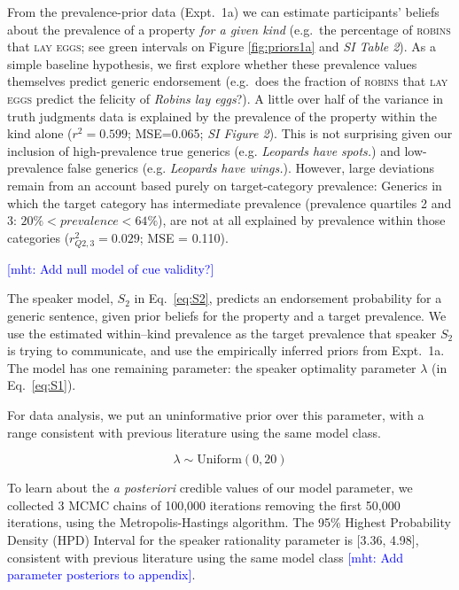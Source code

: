 \documentclass[12pt,letterpaper]{article}
\newcommand{\mht}[1]{\textcolor{Blue}{[mht: #1]}}
\begin{document}
From the prevalence-prior data (Expt.~1a) we can estimate participants' beliefs about the prevalence of a property \emph{for a given kind} (e.g.~the percentage of \textsc{robins} that \textsc{lay eggs}; see green intervals on Figure \ref{fig:priors1a} and \emph{SI Table 2}).
As a simple baseline hypothesis, we first explore whether these prevalence values themselves predict generic endorsement (e.g.~does the fraction of \textsc{robins} that \textsc{lay eggs} predict the felicity of \emph{Robins lay eggs}?).
A little over half of the variance in truth judgments data is explained by the prevalence of the property within the kind alone ($r^2 = 0.599$; MSE=0.065; \emph{SI Figure 2}). 
This is not surprising given our inclusion of high-prevalence true generics (e.g. \emph{Leopards have spots.}) and low-prevalence false generics (e.g. \emph{Leopards have wings.}). 
However, large deviations remain from an account based purely on target-category prevalence: Generics in which the target category has intermediate prevalence (prevalence quartiles 2 and 3: $ 20\% < prevalence < 64\%$), are not at all explained by prevalence within those categories ($r_{Q2,3}^2 = 0.029$; MSE = 0.110).


\mht{Add null model of cue validity?}

The speaker model, $S_2$ in Eq.~\ref{eq:S2}, predicts an endorsement probability for a generic sentence, given prior beliefs for the property and a target prevalence. 
We use the estimated within--kind prevalence as the target prevalence that speaker $S_2$ is trying to communicate, and use the
empirically inferred priors from Expt.~1a. The model has one remaining parameter: the speaker optimality parameter $\lambda$ (in Eq.~\ref{eq:S1}).

For data analysis, we put an uninformative prior over this parameter, with a range consistent with previous literature using the same model class.

$$
\lambda \sim \text{Uniform}(0,20)
$$

To learn about the \emph{a posteriori} credible values of our model parameter, we collected 3 MCMC chains of 100,000 iterations removing the first 50,000 iterations, using the Metropolis-Hastings algorithm. 
The 95\% Highest Probability Density (HPD) Interval for the speaker rationality parameter is [3.36, 4.98], consistent with previous literature using the same model class \mht{Add parameter posteriors to appendix}.
\end{document}

